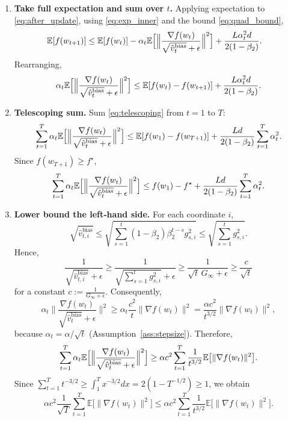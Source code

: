 \documentclass{article}
\begin{document}
\begin{enumerate}
\item[Step 5.] \textbf{Take full expectation and sum over $t$.} Applying expectation to \eqref{eq:after_update}, using \eqref{eq:exp_inner} and the bound \eqref{eq:quad_bound},
\begin{align}
\mathbb{E}[f(w_{t+1})] 
&\le \mathbb{E}[f(w_t)]
 -\alpha_t\mathbb{E}\Bigl[\Big\|\frac{\nabla f(w_t)}{\sqrt{\hat v_t^{\text{bias}}}+\epsilon}\Big\|^{2}\Bigr]
 +\frac{L\alpha_t^{2}d}{2(1-\beta_2)} .
\end{align}
Rearranging,
\begin{align}
\alpha_t\mathbb{E}\Bigl[\Big\|\frac{\nabla f(w_t)}{\sqrt{\hat v_t^{\text{bias}}}+\epsilon}\Bigr\|^{2}\Bigr]
\le \mathbb{E}[f(w_t)-f(w_{t+1})]
     +\frac{L\alpha_t^{2}d}{2(1-\beta_2)} .
\label{eq:telescoping}
\end{align}

\item[Step 6.] \textbf{Telescoping sum.} Sum \eqref{eq:telescoping} from $t=1$ to $T$:
\begin{align}
\sum_{t=1}^{T}\alpha_t\mathbb{E}\Bigl[\Big\|\frac{\nabla f(w_t)}{\sqrt{\hat v_t^{\text{bias}}}+\epsilon}\Bigr\|^{2}\Bigr]
\le \mathbb{E}[f(w_1)-f(w_{T+1})]
     +\frac{L d}{2(1-\beta_2)}\sum_{t=1}^{T}\alpha_t^{2}.
\end{align}
Since $f(w_{T+1})\ge f^\star$,
\begin{align}
\sum_{t=1}^{T}\alpha_t\mathbb{E}\Bigl[\Big\|\frac{\nabla f(w_t)}{\sqrt{\hat v_t^{\text{bias}}}+\epsilon}\Bigr\|^{2}\Bigr]
\le f(w_1)-f^\star
     +\frac{L d}{2(1-\beta_2)}\sum_{t=1}^{T}\alpha_t^{2}.
\label{eq:sum_bound}
\end{align}

\item[Step 7.] \textbf{Lower bound the left‑hand side.} For each coordinate $i$,
\[
\sqrt{\hat v_{t,i}^{\text{bias}}} \le \sqrt{\sum_{s=1}^{t}(1-\beta_2) \beta_2^{t-s} g_{s,i}^{2}} \le \sqrt{\sum_{s=1}^{t} g_{s,i}^{2}} .
\]
Hence,
\[
\frac{1}{\sqrt{\hat v_{t,i}^{\text{bias}}}+\epsilon}
\ge \frac{1}{\sqrt{\sum_{s=1}^{t} g_{s,i}^{2}}+\epsilon}
\ge \frac{1}{\sqrt{t}\,G_\infty +\epsilon}\ge \frac{c}{\sqrt{t}}
\]
for a constant $c:=\frac{1}{G_\infty+\epsilon}$. Consequently,
\[
\alpha_t\Big\|\frac{\nabla f(w_t)}{\sqrt{\hat v_t^{\text{bias}}}+\epsilon}\Big\|^{2}
\ge \alpha_t \frac{c^{2}}{t}\|\nabla f(w_t)\|^{2}
= \frac{\alpha c^{2}}{t^{3/2}}\|\nabla f(w_t)\|^{2},
\]
because $\alpha_t=\alpha/\sqrt{t}$ (Assumption~\ref{ass:stepsize}). Therefore,
\begin{align}
\sum_{t=1}^{T}\alpha_t\mathbb{E}\Bigl[\Big\|\frac{\nabla f(w_t)}{\sqrt{\hat v_t^{\text{bias}}}+\epsilon}\Bigr\|^{2}\Bigr]
\ge \alpha c^{2}\sum_{t=1}^{T}\frac{1}{t^{3/2}}\mathbb{E}\bigl[\|\nabla f(w_t)\|^{2}\bigr].
\label{eq:lower_bound}
\end{align}
Since $\sum_{t=1}^{T}t^{-3/2}\ge \int_{1}^{T}x^{-3/2}dx = 2(1- T^{-1/2})\ge 1$, we obtain
\[
\alpha c^{2}\frac{1}{\sqrt{T}}\sum_{t=1}^{T}\mathbb{E}\bigl[\|\nabla f(w_t)\|^{2}\bigr]
\le \alpha c^{2}\sum_{t=1}^{T}\frac{1}{t^{3/2}}\mathbb{E}\bigl[\|\nabla f(w_t)\|^{2}\bigr].
\]


\end{enumerate}
\end{document}
